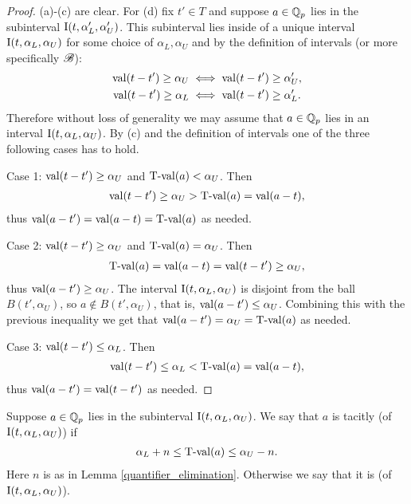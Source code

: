 \begin{proof}
  (a)-(c) are clear.
  For (d) fix $t' \in T$ and suppose $a \in \mathbb{Q}_p$ lies in the subinterval $\operatorname{I}(t, \alpha_L', \alpha_U')$.
  This  subinterval lies inside of a unique interval $\operatorname{I}(t, \alpha_L, \alpha_U)$ for some choice of $\alpha_L, \alpha_U$ and
  by the definition of intervals (or more specifically $\mathscr B$):
  \begin{align*}
    \operatorname{val}(t - t') \geq \alpha_U &\iff \operatorname{val}(t - t') \geq \alpha_U',\\
    \operatorname{val}(t - t') \geq \alpha_L &\iff \operatorname{val}(t - t') \geq \alpha_L'.
  \end{align*}
  Therefore without loss of generality we may assume that $a \in \mathbb{Q}_p$ lies in an interval $\operatorname{I}(t, \alpha_L, \alpha_U)$.
  By (c) and the definition of intervals one of the three following cases has to hold.
  
  Case 1: $\operatorname{val}(t - t') \geq \alpha_U$ and $\operatorname{T-val}(a) < \alpha_U$. Then
  \begin{align*}
    \operatorname{val}(t - t') \geq \alpha_U > \operatorname{T-val}(a) = \operatorname{val}(a - t),
  \end{align*}
  thus $\operatorname{val}(a - t') = \operatorname{val}(a - t) = \operatorname{T-val}(a)$ as needed.

  Case 2: $\operatorname{val}(t - t') \geq \alpha_U$ and $\operatorname{T-val}(a) = \alpha_U$. Then
  \begin{align*}
    \operatorname{T-val}(a) = \operatorname{val}(a - t) = \operatorname{val}(t - t') \geq \alpha_U,
  \end{align*}
  thus $\operatorname{val}(a - t') \geq \alpha_U$.
  The interval $\operatorname{I}(t, \alpha_L, \alpha_U)$ is disjoint from the ball $B(t', \alpha_U)$,
  so $a \notin B(t', \alpha_U)$, that is, $\operatorname{val}(a - t') \leq \alpha_U$.
  Combining this with the previous inequality we get that $\operatorname{val}(a - t') = \alpha_U = \operatorname{T-val}(a)$ as needed.

  Case 3: $\operatorname{val}(t - t') \leq \alpha_L$. Then
  \begin{align*}
    \operatorname{val}(t - t') \leq \alpha_L < \operatorname{T-val}(a) = \operatorname{val}(a - t),
  \end{align*}
  thus $\operatorname{val}(a - t') = \operatorname{val}(t - t')$ as needed. 
\end{proof}




\begin{Definition}
  Suppose $a \in \mathbb{Q}_p$ lies in the subinterval $\operatorname{I}(t, \alpha_L, \alpha_U)$.
  We say that $a$ is  tacitly (of $\operatorname{I}(t, \alpha_L, \alpha_U)$) if 
    \begin{align*}
	\alpha_L + n \leq \operatorname{T-val}(a) \leq \alpha_U - n.
    \end{align*}
  Here $n$ is as in Lemma \ref{quantifier_elimination}.
  Otherwise we say that it is  (of $\operatorname{I}(t, \alpha_L, \alpha_U)$).
\end{Definition}

